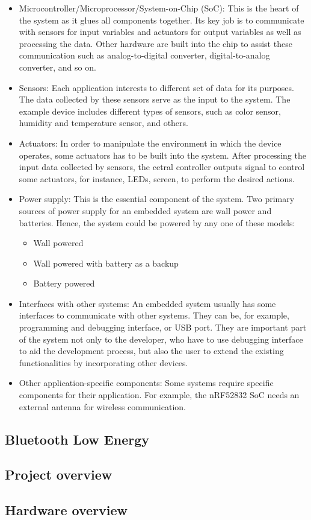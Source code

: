 \begin{itemize}
    \item Microcontroller/Microprocessor/System-on-Chip (SoC): 
        This is the heart of the system as it glues all components together.
        Its key job is to communicate with sensors for input variables and 
        actuators for output variables as well as processing the data. Other 
        hardware are built into the chip to assist these communication such as 
        analog-to-digital converter, digital-to-analog converter, and so on.

    \item Sensors:
        Each application interests to different set of data for its purposes. 
        The data collected by these sensors serve as the input to the system.
        The example device includes different types of sensors, such as color
        sensor, humidity and temperature sensor, and others.
    \item Actuators:
        In order to manipulate the environment in which the device operates,
        some actuators has to be built into the system. After processing the 
        input data collected by sensors, the cetral controller outputs signal 
        to control some actuators, for instance, LEDs, screen, to perform 
        the desired actions.    
    \item Power supply:
        This is the essential component of the system. Two primary sources of 
        power supply for an embedded system are wall power and batteries. Hence,
        the system could be powered by any one of these models:
        \begin{itemize}
            \item Wall powered
            \item Wall powered with battery as a backup
            \item Battery powered
        \end{itemize}
    \item Interfaces with other systems:
        An embedded system usually has some interfaces to communicate with other
        systems. They can be, for example, programming and debugging interface, 
        or USB port. They are important part of the system not only to the developer,
        who have to use debugging interface to aid the development process, but also
        the user to extend the existing functionalities by incorporating other devices.  
    \item Other application-specific components:
        Some systems require specific components for their application. For example, 
        the nRF52832 SoC needs an external antenna for wireless communication.
\end{itemize}

\subsection{Bluetooth Low Energy}

\subsection{Project overview}

\subsection{Hardware overview}